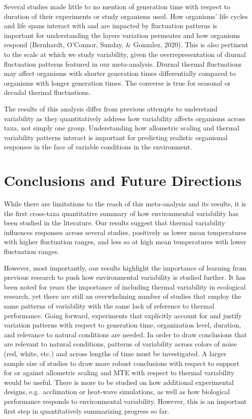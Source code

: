 \documentclass[12pt,twoside]{reedthesis}
\begin{document}
Several studies made little to no mention of generation time with respect to duration of their experiments or study organisms used. How organisms' life cycles and life spans interact with and are impacted by fluctuation patterns is important for understanding the layers variation permeates and how organisms respond (Bernhardt, O'Connor, Sunday, \& Gonzalez, 2020). This is also pertinent to the scale at which we study variability, given the overrepresentation of diurnal fluctuation patterns featured in our meta-analysis. Diurnal thermal fluctuations may affect organisms with shorter generation times differentially compared to organisms with longer generation times. The converse is true for seasonal or decadal thermal fluctuations.

The results of this analysis differ from previous attempts to understand variability as they quantitatively address how variability affects organisms across taxa, not simply one group. Understanding how allometric scaling and thermal variability patterns interact is important for predicting realistic organismal responses in the face of variable conditions in the environment.

\hypertarget{conclusions-and-future-directions}{%
\chapter*{Conclusions and Future Directions}\label{conclusions-and-future-directions}}

While there are limitations to the reach of this meta-analysis and its results, it is the first cross-taxa quantitative summary of how environmental variability has been studied in the literature. Our results suggest that thermal variability influences responses across several studies, positively as lower mean temperatures with higher fluctuation ranges, and less so at high mean temperatures with lower fluctuation ranges.

However, most importantly, our results highlight the importance of learning from previous research to push how environmental variability is studied further. It has been noted for years the importance of including thermal variability in ecological research, yet there are still an overwhelming number of studies that employ the same patterns of variability with the same lack of reference to thermal performance. Going forward, experiments that explicitly account for and justify variation patterns with respect to generation time, organization level, duration, and relevance to natural conditions are needed. In order to draw conclusions that are relevant to natural conditions, patterns of variability across colors of noise (red, white, etc.) and across lengths of time must be investigated. A larger sample size of studies to draw more robust conclusions with respect to support for or against allometric scaling and MTE with respect to thermal variability would be useful. There is more to be studied on how additional experimental designs, e.g.~acclimation or heat-wave simulations, as well as how biological performance responds to environmental variability. However, this is an important first step in quantitatively summarizing progress so far.
\end{document}
